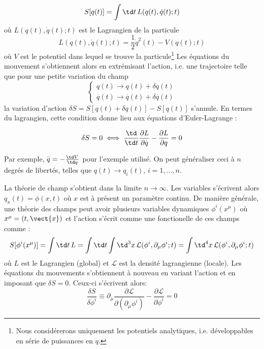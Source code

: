 \begin{equation}
    S[q(t)] = \int \td t \, L(q(t), \dot q(t); t)
\end{equation}
où $L(q(t), \dot q (t); t)$ est le Lagrangien de la particule 
\begin{equation}
    L(q(t), \dot q(t); t) = \frac{1}{2}\dot q^2(t) - V(q(t); t)
\end{equation}
où $V$ est le potentiel dans lequel se trouve la particule\footnote{Nous considérerons uniquement les potentiels analytiques, i.e. développables en série de puissances en $q$.} Les équations du mouvement s'obtiennent alors en extrémisant l'action, i.e. une trajectoire telle que pour une petite variation du champ
\begin{equation}
\left\{
\begin{array}{l}
q(t) \rightarrow q(t) + \delta q(t)\\
\overset{.}{q}(t) \rightarrow \overset{.}{q}(t) + \delta \overset{.}{q} (t)
\end{array}
\right.
\end{equation}
la variation d'action $\delta S = S[q(t) + \delta q(t)] -S[q(t)]$ s'annule. En termes du lagrangien, cette condition donne lieu aux équations d'Euler-Lagrange :

\begin{equation}
    \delta S = 0 \iff \frac{\td }{\td t}\frac{\partial L}{\partial \overset{.}{q}} - \frac{\partial L}{\partial q} = 0
\end{equation}

Par exemple, $\overset{..}{q} = -\frac{\td V}{\td q}$ pour l'exemple utilisé. On peut généraliser ceci à $n$ degrés de libertés, telles que $q(t) \to q_{i}(t)$, $i = 1, ..., n$. 

La théorie de champ s'obtient dans la limite $n \to \infty$. Les variables s'écrivent alors $q_x(t) = \phi (x, t) $ où $x$ est à présent un paramètre continu. De manière générale, une théorie des champs peut avoir plusieurs variables dynamiques $\phi^{i}(x^{\mu})$ où $x^{\mu} = (t, \vect{x})$ et l'action s'écrit comme une fonctionelle de ces champs comme :
\begin{align}
    S[\phi^i(x^\mu)] = \int \td t\, L = \int \td t \int \td ^3x \,\mathcal{L}(\phi^{i}, \partial_{\mu} \phi^{i};t) = \int \td ^4x \,\mathcal{L}(\phi^{i}, \partial_{\mu} \phi^{i};t)
\end{align}
où $L$ est le Lagrangien (global) et $\mathcal{L}$ est la densité lagrangienne (locale). Les équations du mouvements s'obtiennent à nouveau en variant l'action et en imposant que $\delta S = 0$. Ceux-ci s'écrivent alors:
\begin{equation}
   \boxed{\frac{\delta S}{\delta \phi^i} \equiv \partial_{\mu}\frac{\partial \mathcal{L}}{\partial (\partial_{\mu}\phi^{i})} - \frac{\partial \mathcal{L}}{\partial \phi^{i}} = 0}
\end{equation}

